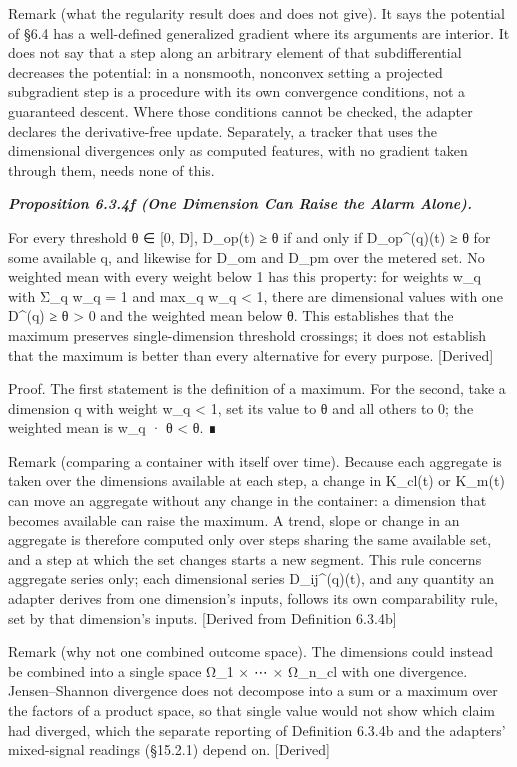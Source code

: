 \documentclass[
]{article}
\begin{document}
Remark (what the regularity result does and does not give). It says the
potential of §6.4 has a well-defined generalized gradient where its
arguments are interior. It does not say that a step along an arbitrary
element of that subdifferential decreases the potential: in a nonsmooth,
nonconvex setting a projected subgradient step is a procedure with its
own convergence conditions, not a guaranteed descent. Where those
conditions cannot be checked, the adapter declares the derivative-free
update. Separately, a tracker that uses the dimensional divergences only
as computed features, with no gradient taken through them, needs none of
this.

\emph{\textbf{Proposition 6.3.4f (One Dimension Can Raise the Alarm
Alone).}}

For every threshold θ ∈ {[}0, D̄{]}, D\_op(t) ≥ θ if and only if
D\_op\^{}(q)(t) ≥ θ for some available q, and likewise for D\_om and
D\_pm over the metered set. No weighted mean with every weight below 1
has this property: for weights w\_q with Σ\_q w\_q = 1 and max\_q w\_q
\textless{} 1, there are dimensional values with one D\^{}(q) ≥ θ
\textgreater{} 0 and the weighted mean below θ. This establishes that
the maximum preserves single-dimension threshold crossings; it does not
establish that the maximum is better than every alternative for every
purpose. {[}Derived{]}

Proof. The first statement is the definition of a maximum. For the
second, take a dimension q with weight w\_q \textless{} 1, set its value
to θ and all others to 0; the weighted mean is w\_q · θ \textless{} θ. ∎

Remark (comparing a container with itself over time). Because each
aggregate is taken over the dimensions available at each step, a change
in K\_cl(t) or K\_m(t) can move an aggregate without any change in the
container: a dimension that becomes available can raise the maximum. A
trend, slope or change in an aggregate is therefore computed only over
steps sharing the same available set, and a step at which the set
changes starts a new segment. This rule concerns aggregate series only;
each dimensional series D\_ij\^{}(q)(t), and any quantity an adapter
derives from one dimension's inputs, follows its own comparability rule,
set by that dimension's inputs. {[}Derived from Definition 6.3.4b{]}

Remark (why not one combined outcome space). The dimensions could
instead be combined into a single space Ω\_1 × ⋯ × Ω\_n\_cl with one
divergence. Jensen--Shannon divergence does not decompose into a sum or
a maximum over the factors of a product space, so that single value
would not show which claim had diverged, which the separate reporting of
Definition 6.3.4b and the adapters' mixed-signal readings (§15.2.1)
depend on. {[}Derived{]}
\end{document}
